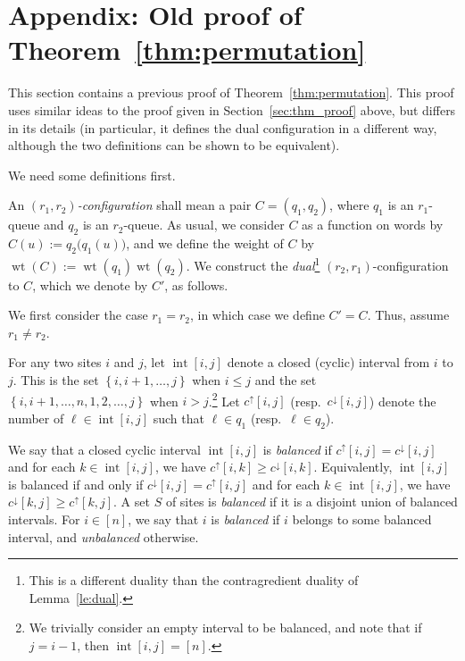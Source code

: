 \documentclass[reqno]{amsart}
\newcommand{\0}{\phantom{c}}
\DeclareMathOperator{\inter}{int} %
\DeclareMathOperator{\wt}{wt} %
\newenvironment{verlong}{}{}
\newcommand{\set}[1]{\left\{ #1 \right\}}
\newcommand{\ive}[1]{\left[ #1 \right]}
\newcommand{\defn}[1]{{\color{darkred}\emph{#1}}} %
\theoremstyle{plain}
\theoremstyle{definition}
\numberwithin{equation}{section}
\begin{document}
\begin{verlong}
\section{Appendix: Old proof of Theorem~\ref{thm:permutation}}
\label{sec:thm_proof-old6}

This section contains a previous proof of Theorem~\ref{thm:permutation}.
This proof uses similar ideas to the proof given in Section~\ref{sec:thm_proof} above,
but differs in its details (in particular, it defines the dual configuration
in a different way, although the two definitions can be shown to be equivalent).

We need some definitions first.

An \defn{$(r_1,r_2)$-configuration} shall mean a pair $C = (q_1, q_2)$, where $q_1$ is an $r_1$-queue and $q_2$ is an $r_2$-queue.
As usual, we consider $C$ as a function on words by $C(u) := q_2\bigr(q_1(u)\bigr)$, and we define the weight of $C$ by $\wt(C) := \wt(q_1) \wt(q_2)$.
We construct the \defn{dual}\footnote{This is a different duality than the contragredient duality of Lemma~\ref{le:dual}.} $(r_2,r_1)$-configuration to $C$, which we denote by $C'$, as follows.

We first consider the case $r_1 = r_2$, in which case we define $C' = C$.
Thus, assume $r_1 \neq r_2$.

For any two sites $i$ and $j$, let $\inter[i,j]$ denote a closed (cyclic) interval from $i$ to $j$.
This is the set $\set{i, i+1, \ldots, j}$ when $i \leq j$ and the set $\set{i, i+1, \ldots, n, 1, 2, \ldots, j}$ when $i > j$.\footnote{We trivially consider an empty interval to be balanced, and note that if $j = i-1$, then $\inter[i,j] = \ive{n}$.}
Let $c^{\uparrow}[i,j]$ (resp.~$c^{\downarrow}[i,j]$) denote the number of $\ell \in \inter[i,j]$ such that $\ell \in q_1$ (resp.~$\ell \in q_2$).

We say that a closed cyclic interval $\inter[i,j]$ is \defn{balanced} if $c^{\uparrow}[i,j] = c^{\downarrow}[i,j]$ and for each $k \in \inter[i,j]$, we have $c^\uparrow[i,k] \geq c^\downarrow[i,k]$.
Equivalently, $\inter[i,j]$ is balanced if and only if $c^{\downarrow}[i,j] = c^{\uparrow}[i,j]$ and for each $k \in \inter[i,j]$, we have $c^\downarrow[k,j] \geq c^\uparrow[k,j]$.
A set $S$ of sites is \defn{balanced} if it is a disjoint union of balanced intervals.
For $i \in \ive{n}$, we say that $i$ is \defn{balanced} if $i$ belongs to some balanced interval, and \defn{unbalanced} otherwise.


\end{verlong}
\end{document}
